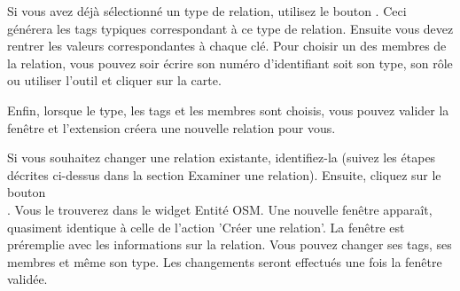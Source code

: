 Si vous avez déjà sélectionné un type de relation, utilisez le bouton . Ceci générera les tags typiques correspondant à ce type de relation. Ensuite vous devez rentrer les valeurs correspondantes à chaque clé. Pour choisir un des membres de la relation, vous pouvez soir écrire son numéro d'identifiant soit son type, son rôle ou utiliser l'outil  et cliquer sur la carte.

Enfin, lorsque le type, les tags et les membres sont choisis, vous pouvez valider la fenêtre et l'extension créera une nouvelle relation pour vous.


Si vous souhaitez changer une relation existante, identifiez-la (suivez les étapes décrites ci-dessus dans la section \og Examiner une relation\fg). Ensuite, cliquez sur le bouton\\ . Vous le trouverez dans le widget Entité OSM. Une nouvelle fenêtre apparaît, quasiment identique à celle de l'action 'Créer une relation'. La fenêtre est préremplie avec les informations sur la relation. Vous pouvez changer ses tags, ses membres et même son type. Les changements seront effectués une fois la fenêtre validée.

